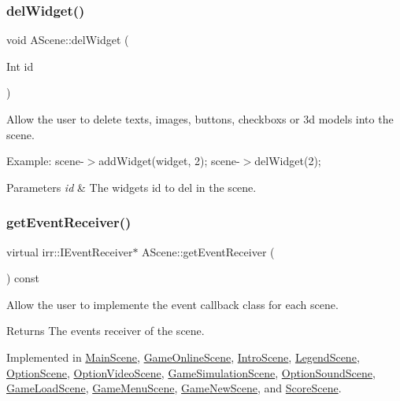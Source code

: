 \subsubsection{\texorpdfstring{del\+Widget()}{delWidget()}}
{\footnotesize\ttfamily void A\+Scene\+::del\+Widget (\begin{DoxyParamCaption}\item[{Int}]{id }\end{DoxyParamCaption})}



Allow the user to delete texts, images, buttons, checkboxs or 3d models into the scene. 

Example\+: scene-\/$>$add\+Widget(widget, 2); scene-\/$>$del\+Widget(2);


\begin{DoxyParams}{Parameters}
{\em id} & The widget\textquotesingle{}s id to del in the scene. \\
\hline
\end{DoxyParams}
\mbox{\label{classAScene_af521e5e6d30a5d2e5d30eb333e4d3abd}} 
\subsubsection{\texorpdfstring{get\+Event\+Receiver()}{getEventReceiver()}}
{\footnotesize\ttfamily virtual irr\+::\+I\+Event\+Receiver$\ast$ A\+Scene\+::get\+Event\+Receiver (\begin{DoxyParamCaption}{ }\end{DoxyParamCaption}) const\hspace{0.3cm}{\ttfamily [pure virtual]}}



Allow the user to implemente the event callback class for each scene. 

\begin{DoxyReturn}{Returns}
The events\textquotesingle{} receiver of the scene. 
\end{DoxyReturn}


Implemented in \hyperlink{classMainScene_af9fbc6337aa6ff42447c702e91e77237}{Main\+Scene}, \hyperlink{classGameOnlineScene_a00ce9773db4f1886fc463b023cbf63f9}{Game\+Online\+Scene}, \hyperlink{classIntroScene_acabf925dab7b2a346edd398445cd5800}{Intro\+Scene}, \hyperlink{classLegendScene_ab11340ae844c04d704f28e1ef188deae}{Legend\+Scene}, \hyperlink{classOptionScene_a8848b9040ee7fd9c1d05a22181c5e053}{Option\+Scene}, \hyperlink{classOptionVideoScene_a84625e871c5176d7abc77a7f12c1472a}{Option\+Video\+Scene}, \hyperlink{classGameSimulationScene_a048b2a937caff3af7b4d54f8bd404ec1}{Game\+Simulation\+Scene}, \hyperlink{classOptionSoundScene_ac71da65763f0db4b05fc32444308b677}{Option\+Sound\+Scene}, \hyperlink{classGameLoadScene_a81807790ad65bd2cf97a1e543cae2b74}{Game\+Load\+Scene}, \hyperlink{classGameMenuScene_adcb01430b24486c4e5d0157fc32d7611}{Game\+Menu\+Scene}, \hyperlink{classGameNewScene_a21c27ef3ea1923d975683e1bcdd134fa}{Game\+New\+Scene}, and \hyperlink{classScoreScene_ae398ba58a33b3605a0c71265202534e2}{Score\+Scene}.

